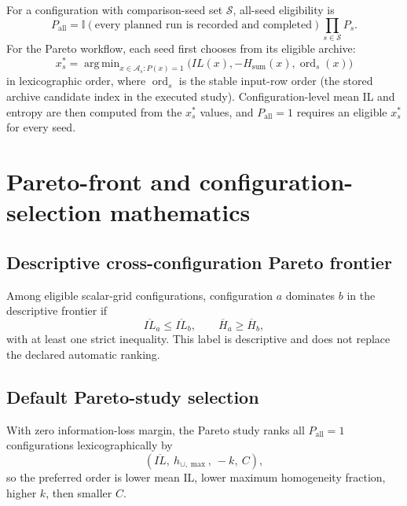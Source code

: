 \documentclass[11pt,a4paper]{article}
\newcommand{\I}{\mathbb{I}}
\DeclareMathOperator*{\argmin}{arg\,min}
\begin{document}
For a configuration with comparison-seed set $\mathcal S$, all-seed
eligibility is
\begin{equation}
P_{\mathrm{all}}=
\I(\text{every planned run is recorded and completed})
\prod_{s\in\mathcal S}P_s.
\tag{89}
\end{equation}
For the Pareto workflow, each seed first chooses from its eligible archive:
\begin{equation}
x_s^*=\argmin_{x\in\mathcal A_s:P(x)=1}
\bigl(IL(x),-H_{\mathrm{sum}}(x),\operatorname{ord}_s(x)\bigr)
\tag{90}
\end{equation}
in lexicographic order, where $\operatorname{ord}_s$ is the stable input-row
order (the stored archive candidate index in the executed study).  Configuration-level
mean IL and entropy are then
computed from the $x_s^*$ values, and $P_{\mathrm{all}}=1$ requires an eligible
$x_s^*$ for every seed.

\section{Pareto-front and configuration-selection mathematics}

\subsection{Descriptive cross-configuration Pareto frontier}

Among eligible scalar-grid configurations, configuration $a$ dominates $b$ in
the descriptive frontier if
\begin{equation}
\overline{IL}_a\le\overline{IL}_b,\qquad
\overline H_a\ge\overline H_b,
\tag{91}
\end{equation}
with at least one strict inequality.  This label is descriptive and does not
replace the declared automatic ranking.

\subsection{Default Pareto-study selection}

With zero information-loss margin, the Pareto study ranks all
$P_{\mathrm{all}}=1$ configurations lexicographically by
\begin{equation}
\left(\overline{IL},\ h_{\cup,\max},\ -k,\ C\right),
\tag{92}
\end{equation}
so the preferred order is lower mean IL, lower maximum homogeneity fraction,
higher $k$, then smaller $C$.
\end{document}
